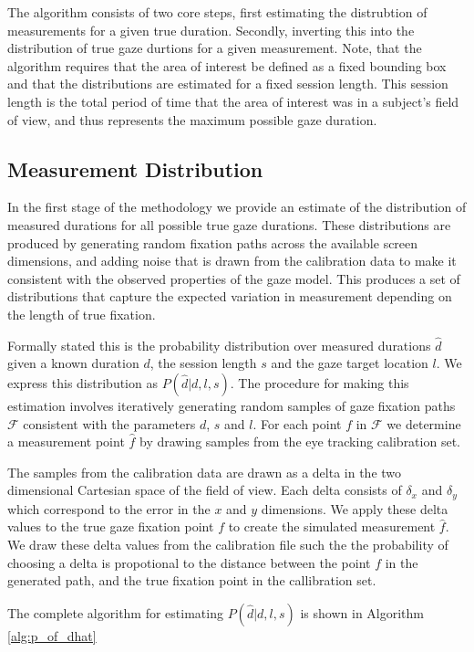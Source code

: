 \documentclass[12pt,a4paper]{article}
\numberwithin{equation}{section}
\begin{document}
The algorithm consists of two core steps, first estimating the distrubtion of measurements
for a given true duration. Secondly, inverting this into the distribution of true
gaze durtions for a given measurement. Note, that the algorithm requires that the area of
interest be defined as a fixed bounding box and that the distributions are estimated for
a fixed session length. This session length is the total period of time that the area of
interest was in a subject's field of view, and thus represents the maximum possible gaze
duration.

\subsection{Measurement Distribution}

In the first stage of the methodology we provide an estimate of the distribution of measured
durations for all possible true gaze durations. These distributions are produced by generating
random fixation paths across the available screen dimensions, and adding noise that is 
drawn from the calibration data to make it consistent with the observed properties of the gaze model.
This produces a set of distributions that capture the expected
variation in measurement depending on the length of true fixation.

Formally stated this is the probability distribution over measured durations $\hat{d}$ given a
known duration $d$, the session length $s$ and the gaze target location $l$. 
We express this distribution as $P(\hat{d}|d,l,s)$. The
procedure for making this estimation involves iteratively generating random samples
of gaze fixation paths $\mathcal{F}$ consistent with the parameters $d$, $s$ and $l$. 
For each point $f$ in $\mathcal{F}$ we determine a measurement point $\hat{f}$ 
by drawing samples from the eye tracking calibration set.
 
The samples from the calibration data are drawn as a delta in the two dimensional Cartesian
space of the field of view. Each delta consists of $\delta_x$ and $\delta_y$ which correspond
to the error in the $x$ and $y$ dimensions. We apply these delta values to the true gaze 
fixation point $f$ to create the simulated measurement $\hat{f}$.
We draw these delta values from the calibration file such the
the probability of choosing a delta is propotional to the distance between the point $f$
in the generated path, and the true fixation point in the callibration set. 

The complete algorithm for estimating $P(\hat{d}|d,l,s)$ is shown in Algorithm \ref{alg:p_of_dhat}    
\end{document}
